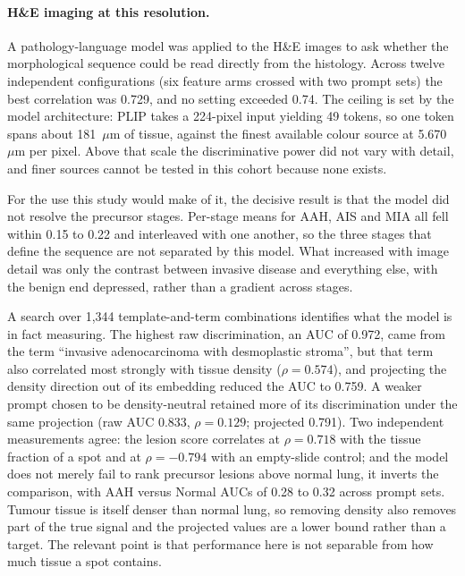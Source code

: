 \paragraph{H\&E imaging at this resolution.} A pathology-language model
\citep{huang2023plip} was applied to the H\&E images to ask whether the morphological sequence
could be read directly from the histology. Across twelve independent configurations (six
feature arms crossed with two prompt sets) the best correlation was 0.729, and no setting
exceeded 0.74. The ceiling is set by the model architecture: PLIP takes a 224-pixel input
yielding 49 tokens, so one token spans about 181~$\mu$m of tissue, against the finest
available colour source at 5.670~$\mu$m per pixel. Above that scale the discriminative power
did not vary with detail, and finer sources cannot be tested in this cohort because none
exists.

For the use this study would make of it, the decisive result is that the model did not
resolve the precursor stages. Per-stage means for AAH, AIS and MIA all fell within 0.15 to
0.22 and interleaved with one another, so the three stages that define the sequence are not
separated by this model. What increased with image detail was only the contrast between
invasive disease and everything else, with the benign end depressed, rather than a gradient
across stages.

A search over 1,344 template-and-term combinations identifies what the model is in fact
measuring. The highest raw discrimination, an AUC of 0.972, came from the term
``invasive adenocarcinoma with desmoplastic stroma'', but that term also correlated most
strongly with tissue density ($\rho=0.574$), and projecting the density direction out of its
embedding reduced the AUC to 0.759. A weaker prompt chosen to be density-neutral retained
more of its discrimination under the same projection (raw AUC 0.833, $\rho=0.129$;
projected 0.791). Two independent measurements agree: the lesion score correlates at
$\rho=0.718$ with the tissue fraction of a spot and at $\rho=-0.794$ with an empty-slide
control; and the model does not merely fail to rank precursor lesions above normal lung, it
inverts the comparison, with AAH versus Normal AUCs of 0.28 to 0.32 across prompt sets.
Tumour tissue is itself denser than normal lung, so removing density also removes part of the
true signal and the projected values are a lower bound rather than a target. The relevant
point is that performance here is not separable from how much tissue a spot contains.

